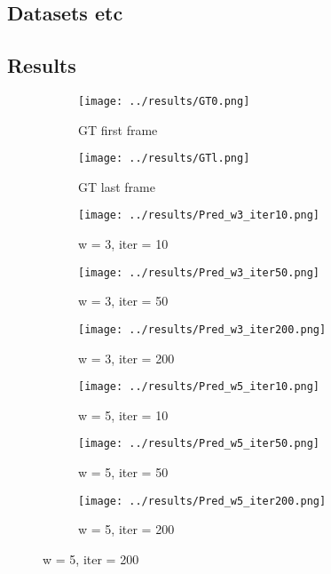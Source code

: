 \documentclass{article}
\begin{document}
\subsection{Datasets etc}
\subsection{Results}

\begin{figure}
\label{results}
    \centering
    
	\begin{subfigure}[b]{0.3\textwidth}
		\centering    
        \texttt{[image: ../results/GT0.png]}
        \caption{GT first frame}
    \end{subfigure}
    \begin{subfigure}[b]{0.3\textwidth}
        \centering
        \texttt{[image: ../results/GTl.png]}
        \caption{GT last frame}
    \end{subfigure}%

    \begin{subfigure}[t]{0.3\textwidth}
        \centering
        \texttt{[image: ../results/Pred\_w3\_iter10.png]}
        \caption{w = 3, iter = 10}
    \end{subfigure}
    \begin{subfigure}[t]{0.3\textwidth}
        \centering
        \texttt{[image: ../results/Pred\_w3\_iter50.png]}
        \caption{w = 3, iter = 50}
    \end{subfigure}
    \begin{subfigure}[t]{0.3\textwidth}
        \centering
        \texttt{[image: ../results/Pred\_w3\_iter200.png]}
        \caption{w = 3, iter = 200}
    \end{subfigure}
   
    \begin{subfigure}[t]{0.3\textwidth}
        \centering
        \texttt{[image: ../results/Pred\_w5\_iter10.png]}
        \caption{w = 5, iter = 10}
    \end{subfigure}
    \begin{subfigure}[t]{0.3\textwidth}
        \centering
        \texttt{[image: ../results/Pred\_w5\_iter50.png]}
        \caption{w = 5, iter = 50}
    \end{subfigure}
    \begin{subfigure}[t]{0.3\textwidth}
        \centering
        \texttt{[image: ../results/Pred\_w5\_iter200.png]}
        \caption{w = 5, iter = 200}
    \end{subfigure}


\end{figure}
\end{document}
